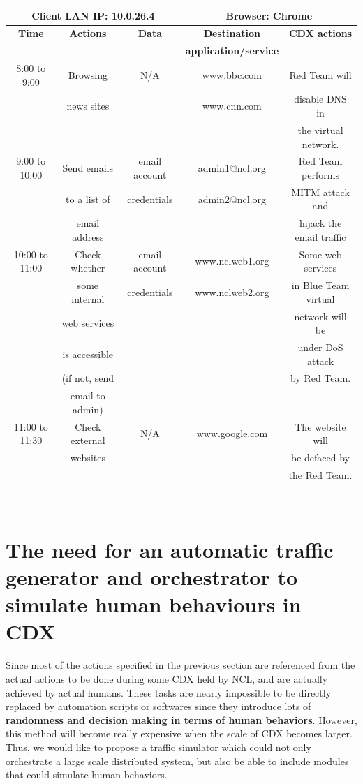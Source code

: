 \documentclass[12pt]{report}
\begin{document}
\setlength{\parindent}{0pt}
\begin{tabular}{ | c | c | c | c | c |}
\hline
\multicolumn{3}{|c|}{Client LAN IP: 10.0.26.4}&\multicolumn{2}{|c|}{Browser: Chrome}\\
\hline
\hline
\textbf{Time} & \textbf{Actions} & \textbf{Data} & \textbf{Destination} & \textbf{CDX actions}\\
& & & \textbf{application/service} & \\
\hline
8:00 to 9:00 & Browsing & N/A & www.bbc.com & Red Team will\\
& news sites & & www.cnn.com & disable DNS in \\
& & & & the virtual network.\\
\hline
9:00 to 10:00 & Send emails & email account & admin1@ncl.org & Red Team performs\\
& to a list of & credentials & admin2@ncl.org & MITM attack and \\
& email address & & & hijack the email traffic\\
\hline
10:00 to 11:00 & Check whether & email account & www.nclweb1.org & Some web services\\
& some internal & credentials  & www.nclweb2.org & in Blue Team virtual \\
& web services & & & network will be \\
& is accessible & & & under DoS attack\\
& (if not, send & & & by Red Team.\\
& email to admin) & & & \\
\hline
11:00 to 11:30 & Check external & N/A & www.google.com & The website will\\
& websites & & & be defaced by\\
& & & & the Red Team. \\
\hline
\end{tabular}\\

\section{The need for an automatic traffic generator and orchestrator to simulate human behaviours in CDX} \label{assumption}
Since most of the actions specified in the previous section are referenced from the actual actions to be done during some CDX held by NCL, and are actually achieved by actual humans. These tasks are nearly impossible to be directly replaced by automation scripts or softwares since they introduce lots of \textbf{randomness and decision making in terms of human behaviors}. However, this method will become really expensive when the scale of CDX becomes larger. Thus, we would like to propose a traffic simulator which could not only orchestrate a large scale distributed system, but also be able to include modules that could simulate human behaviors.\\
\end{document}
